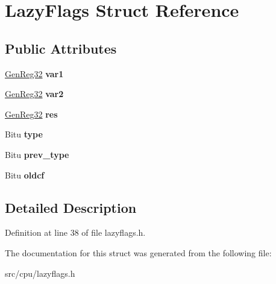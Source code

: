 \hypertarget{structLazyFlags}{\section{Lazy\-Flags Struct Reference}
\label{structLazyFlags}
}
\subsection*{Public Attributes}
\begin{DoxyCompactItemize}
\item 
\hypertarget{structLazyFlags_ac541610d4f91b5d819ceb362c03890f9}{\hyperlink{unionGenReg32}{Gen\-Reg32} {\bfseries var1}}\label{structLazyFlags_ac541610d4f91b5d819ceb362c03890f9}

\item 
\hypertarget{structLazyFlags_a89e15787926574e8e19a139d34f0fd5c}{\hyperlink{unionGenReg32}{Gen\-Reg32} {\bfseries var2}}\label{structLazyFlags_a89e15787926574e8e19a139d34f0fd5c}

\item 
\hypertarget{structLazyFlags_af45822403f24e53a96b97b37ba57a634}{\hyperlink{unionGenReg32}{Gen\-Reg32} {\bfseries res}}\label{structLazyFlags_af45822403f24e53a96b97b37ba57a634}

\item 
\hypertarget{structLazyFlags_a38008372e61ad21ee5eb5c4feb83f249}{Bitu {\bfseries type}}\label{structLazyFlags_a38008372e61ad21ee5eb5c4feb83f249}

\item 
\hypertarget{structLazyFlags_a5c19c6e73d0cd511747fc6fe2e265751}{Bitu {\bfseries prev\-\_\-type}}\label{structLazyFlags_a5c19c6e73d0cd511747fc6fe2e265751}

\item 
\hypertarget{structLazyFlags_af862bf4ea272026f6b17f1c6f543c64b}{Bitu {\bfseries oldcf}}\label{structLazyFlags_af862bf4ea272026f6b17f1c6f543c64b}

\end{DoxyCompactItemize}


\subsection{Detailed Description}


Definition at line 38 of file lazyflags.\-h.



The documentation for this struct was generated from the following file\-:\begin{DoxyCompactItemize}
\item 
src/cpu/lazyflags.\-h\end{DoxyCompactItemize}
